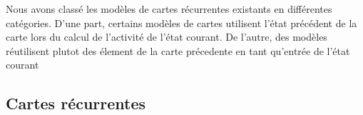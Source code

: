 {%

Nous avons classé les modèles de cartes récurrentes existants en différentes catégories. D'une part, certains modèles de cartes utilisent l'état précédent de la carte lors du calcul de l'activité de l'état courant. De l'autre, des modèles réutilisent plutot des élement de la carte précedente en tant qu'entrée de l'état courant}

\subsection{Cartes récurrentes }


